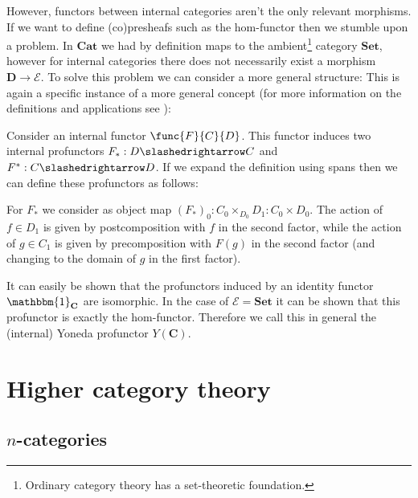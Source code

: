     However, functors between internal categories aren't the only relevant morphisms. If we want to define (co)presheafs such as the hom-functor then we stumble upon a problem. In $\mathbf{Cat}$ we had by definition maps to the ambient\footnote{Ordinary category theory has a set-theoretic foundation.} category $\mathbf{Set}$, however for internal categories there does not necessarily exist a morphism $\mathbf{D}\rightarrow\mathcal{E}$. To solve this problem we can consider a more general structure:
    This is again a specific instance of a more general concept (for more information on the definitions and applications see \cite{maclane, johnstone}):

    \begin{construct}
        Consider an internal functor $\func{F}{C}{D}$. This functor induces two internal profunctors $F_*:D\slashedrightarrow C$ and $F^*:C\slashedrightarrow D$. If we expand the definition using spans then we can define these profunctors as follows:

        \qquad For $F_*$ we consider as object map $(F_*)_0:C_0\times_{D_0} D_1:C_0\times D_0$. The action of $f\in D_1$ is given by postcomposition with $f$ in the second factor, while the action of $g\in C_1$ is given by precomposition with $F(g)$ in the second factor (and changing to the domain of $g$ in the first factor).

        It can easily be shown that the profunctors induced by an identity functor $\mathbbm{1}_{\mathbf{C}}$ are isomorphic. In the case of $\mathcal{E}=\mathbf{Set}$ it can be shown that this profunctor is exactly the hom-functor. Therefore we call this in general the (internal) Yoneda profunctor $Y(\mathbf{C})$.
    \end{construct}

\section{Higher category theory}\label{cat:higher_category_theory}
\subsection{\texorpdfstring{$n$-categories}{n-categories}}

